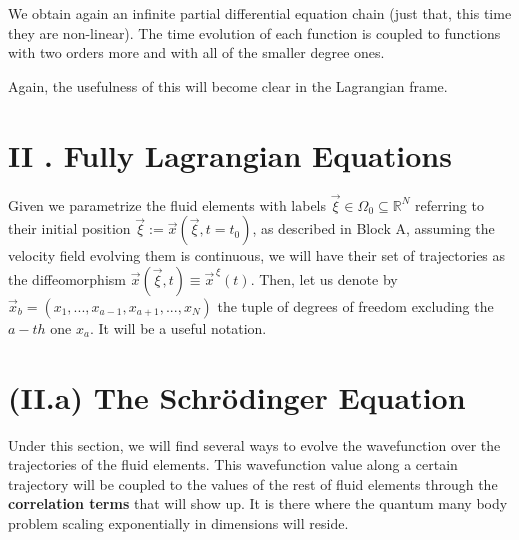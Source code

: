 \documentclass[11pt, a4paper]{article} %
\newcommand{\R}{\mathbb{R}} %
\begin{document}
We obtain again an infinite partial differential equation chain (just that, this time they are non-linear). The time evolution of each function is coupled to functions with two orders more and with all of the smaller degree ones.

Again, the usefulness of this will become clear in the Lagrangian frame.

\newpage
{}

\section*{II . Fully Lagrangian Equations}
Given we parametrize the fluid elements with labels $\vec{\xi}\in\Omega_0\subseteq\R^N$ referring to their initial position $\vec{\xi}:=\vec{x}(\vec{\xi},t=t_0)$, as described in Block A, assuming the velocity field evolving them is continuous, we will have their set of trajectories as the diffeomorphism $\vec{x}(\vec{\xi},t) \equiv \vec{x}^{\, \xi}(t)$.
Then, let us denote by $\vec{x}_b=(x_1,...,x_{a-1}, x_{a+1},...,x_N)$ the tuple of degrees of freedom excluding the $a-th$ one $x_a$. It will be a useful notation.\vspace{-0.3cm}
\section*{(II.a) The Schrödinger Equation\vspace{-0.3cm}}
Under this section, we will find several ways to evolve the wavefunction over the trajectories of the fluid elements. This wavefunction value along a certain trajectory will be coupled to the values of the rest of fluid elements through the {\bf correlation terms} that will show up. It is there where the quantum many body problem scaling exponentially in dimensions will reside.\vspace{-0.3cm}
\end{document}
